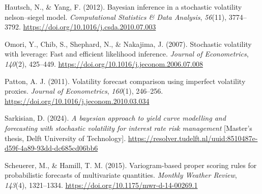 \documentclass[
  12pt,
  letterpaper,
  DIV=11,
  numbers=noendperiod]{scrreprt}
\newlength{\cslhangindent}
\newenvironment{CSLReferences}[2] %
 {\begin{list}{}{%
  \setlength{\itemindent}{0pt}
  \setlength{\leftmargin}{0pt}
  \setlength{\parsep}{0pt}
  \ifodd #1
   \setlength{\leftmargin}{\cslhangindent}
   \setlength{\itemindent}{-1\cslhangindent}
  \fi
  \setlength{\itemsep}{#2\baselineskip}}}
 {\end{list}}
\begin{document}
\begin{CSLReferences}{1}{0}
Hautsch, N., \& Yang, F. (2012). Bayesian inference in a stochastic
volatility nelson--siegel model. \emph{Computational Statistics \& Data
Analysis}, \emph{56}(11), 3774--3792.
\url{https://doi.org/10.1016/j.csda.2010.07.003}

Omori, Y., Chib, S., Shephard, N., \& Nakajima, J. (2007). Stochastic
volatility with leverage: Fast and efficient likelihood inference.
\emph{Journal of Econometrics}, \emph{140}(2), 425--449.
\url{https://doi.org/10.1016/j.jeconom.2006.07.008}

Patton, A. J. (2011). Volatility forecast comparison using imperfect
volatility proxies. \emph{Journal of Econometrics}, \emph{160}(1),
246--256. \url{https://doi.org/10.1016/j.jeconom.2010.03.034}

Sarkisian, D. (2024). \emph{A bayesian approach to yield curve modelling
and forecasting with stochastic volatility for interest rate risk
management} {[}Master's thesis, Delft University of Technology{]}.
\url{https://resolver.tudelft.nl/uuid:8510487e-d59f-4a89-93dd-dc685cd06bb6}

Scheuerer, M., \& Hamill, T. M. (2015). Variogram-based proper scoring
rules for probabilistic forecasts of multivariate quantities.
\emph{Monthly Weather Review}, \emph{143}(4), 1321--1334.
\url{https://doi.org/10.1175/mwr-d-14-00269.1}

\end{CSLReferences}
\end{document}
